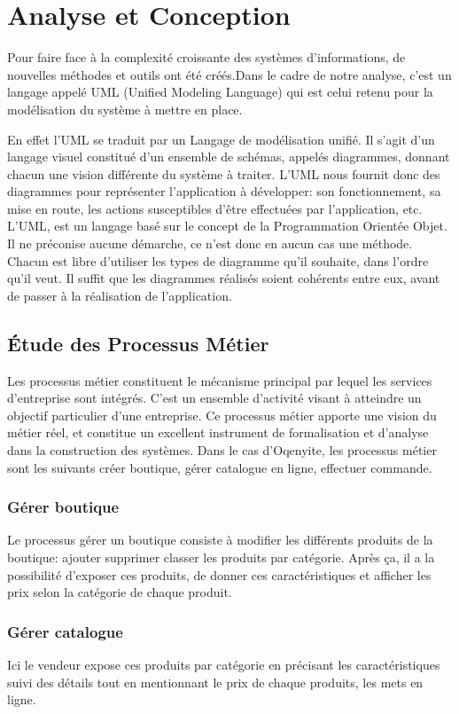 \section{Analyse et Conception}
Pour faire face à la complexité croissante des systèmes d’informations, de nouvelles méthodes et outils ont été créés.Dans le cadre de notre analyse, c’est un langage appelé UML (Unified Modeling Language) qui est celui retenu pour la modélisation du système à mettre en place.

En effet l'UML se traduit par un Langage de modélisation unifié. Il s’agit d’un langage visuel constitué d’un ensemble de schémas, appelés diagrammes, donnant chacun une vision différente du système à traiter. L'UML nous fournit donc des diagrammes pour représenter l’application à développer: son fonctionnement, sa mise en route, les actions susceptibles d’être effectuées par l’application, etc. L'UML, est un langage basé sur le concept de la Programmation Orientée Objet. Il ne préconise aucune démarche, ce n’est donc en aucun cas une méthode. Chacun est libre d’utiliser les types de diagramme qu’il souhaite, dans l’ordre qu’il veut. Il suffit que les diagrammes réalisés soient cohérents entre eux, avant de passer à la réalisation de l’application.

\subsection{Étude des Processus Métier}
Les processus métier constituent le mécanisme principal par lequel les services d'entreprise sont intégrés. C'est un ensemble d'activité visant à atteindre un objectif particulier d'une entreprise. Ce processus métier apporte une vision du métier réel, et constitue un excellent instrument de formalisation et d'analyse dans la construction des systèmes.
Dans le cas d'Oqenyite, les processus métier sont les suivants créer boutique, gérer catalogue en ligne, effectuer commande.


\subsubsection* {Gérer boutique}
Le processus gérer un boutique consiste à  
modifier les différents produits de la boutique: ajouter supprimer classer les produits par catégorie.  Après ça, il a la possibilité d’exposer ces produits, de donner ces caractéristiques et afficher les prix selon la catégorie de chaque produit. 

\subsubsection*{Gérer catalogue}
Ici le vendeur expose ces produits par catégorie en précisant les caractéristiques suivi des détails tout en mentionnant le prix de chaque produits, les mets en ligne.


